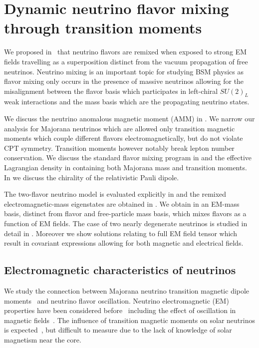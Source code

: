 \chapter{Dynamic neutrino flavor mixing through transition moments}
\label{chap:neutrino}
We proposed in~\cite{Rafelski:2023zgp} that neutrino flavors are remixed when exposed to strong EM fields travelling as a superposition distinct from the vacuum propagation of free neutrinos. Neutrino mixing is an important topic for studying BSM physics as flavor mixing only occurs in the presence of massive neutrinos allowing for the misalignment between the flavor basis which participates in left-chiral $SU(2)_{L}$ weak interactions and the mass basis which are the propagating neutrino states.

We discuss the neutrino anomalous magnetic moment (AMM) in . We narrow our analysis for Majorana neutrinos which are allowed only transition magnetic moments which couple different flavors electromagnetically, but do not violate CPT symmetry. Transition moments however notably break lepton number conservation. We discuss the standard flavor mixing program in  and the effective Lagrangian density in  containing both Majorana mass and transition moments. In  we discuss the chirality of the relativistic Pauli dipole.

The two-flavor neutrino model is evaluated explicitly in  and the remixed electromagnetic-mass eigenstates are obtained in . We obtain in  an EM-mass basis, distinct from flavor and free-particle mass basis, which mixes flavors as a function of EM fields. The case of two nearly degenerate neutrinos is studied in detail in . Moreover we show solutions relating to full EM field tensor which result in covariant expressions allowing for both magnetic and electrical fields.

\section{Electromagnetic characteristics of neutrinos}
\label{sec:numoment}
We study the connection between Majorana neutrino transition magnetic dipole moments~\citep{Fujikawa:1980yx,Shrock:1980vy,Shrock:1982sc} and neutrino flavor oscillation. Neutrino electromagnetic (EM) properties have been considered before~\citep{Schechter:1981hw,Giunti:2014ixa,Popov:2019nkr,Dvornikov:2019sfo,Chukhnova:2019oum} including the effect of oscillation in magnetic fields~\citep{Lim:1987tk,Akhmedov:1988uk,Pal:1991pm,Elizalde:2004mw,Akhmedov:2022txm}. The influence of transition magnetic moments on solar neutrinos is expected~\citep{Martinez-Mirave:2023fyb}, but difficult to measure due to the lack of knowledge of solar magnetism near the core.


